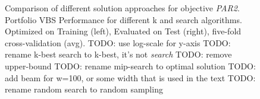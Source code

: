 \documentclass[conference]{IEEEtran}
\newcommand{\todo}[1]{{\color{red}TODO: #1}}
\begin{document}
\begin{figure}[t]
	\centering
	\hfil
	\caption{Comparison of different solution approaches for objective \emph{PAR2}. Portfolio VBS Performance for different k and search algorithms. Optimized on Training (left), Evaluated on Test (right), five-fold cross-validation (avg). 
\todo{use log-scale for y-axis}
\todo{rename k-best search to k-best, it's not \emph{search}}
\todo{remove upper-bound}
\todo{rename mip-search to optimal solution}
\todo{add beam for w=100, or some width that is used in the text}
\todo{rename random search to random sampling}}
\label{fig:search-train-objective}
\end{figure}
\end{document}
